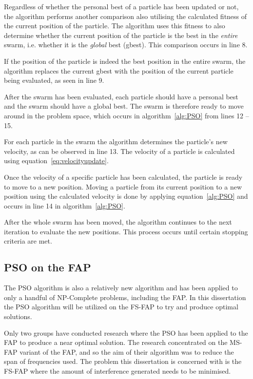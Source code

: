 Regardless of whether the personal best of a particle has been updated or not, the algorithm performs another comparison also utilising the calculated fitness of the current position of the particle. The algorithm uses this fitness to also determine whether the current position of the particle is the best in the \emph{entire} swarm, i.e. whether it is  the \emph{global} best (gbest). This comparison occurs in line  8.

If the position of the particle is indeed the best position in the entire swarm, the algorithm replaces the current gbest with the position of the current particle being evaluated, as seen in line 9.

After the swarm has been evaluated, each particle should have a personal best and the swarm should have a global best. The swarm is therefore ready to move around in the problem space, which occurs in algorithm~\ref{alg:PSO} from lines 12 -- 15.

For each particle in the swarm the algorithm determines the particle's new velocity, as can be observed in line 13. The velocity of a particle is calculated using equation~\ref{eq:velocityupdate}. 

Once the velocity of a specific particle has been calculated, the particle is ready to move to a new position. Moving a particle from its current position to a new position using the calculated velocity is done by applying equation~\ref{alg:PSO} and occurs in line 14 in algorithm~\ref{alg:PSO}.

After the whole swarm has been moved, the algorithm continues to the next iteration to evaluate the new positions. This process occurs until certain stopping criteria are met.


\subsection{PSO on the FAP}
\label{sec:psoonfap}
The PSO algorithm is also a relatively new algorithm and has been applied to only a handful of NP-Complete problems, including the FAP. In this dissertation the PSO algorithm will be utilized on the FS-FAP to try and produce optimal solutions. 

Only two groups have conducted research where the PSO has been applied to the FAP to produce a near optimal solution. The research concentrated on the MS-FAP variant of the FAP, and so the aim of their algorithm was to reduce the span of frequencies used. The problem this dissertation is concerned with is the FS-FAP where the amount of interference generated needs to be minimised. 

